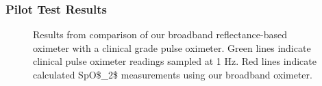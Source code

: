 \subsubsection{Pilot Test Results}
\begin{figure}
    \begin{center}
    \end{center}
    \caption{Results from comparison of our broadband reflectance-based oximeter with a clinical grade pulse oximeter. Green lines indicate clinical pulse oximeter readings sampled at 1 Hz. Red lines indicate calculated \ac{SpO$_2$} measurements using our broadband oximeter. } 
    \label{fig:D3results}
\end{figure} 
